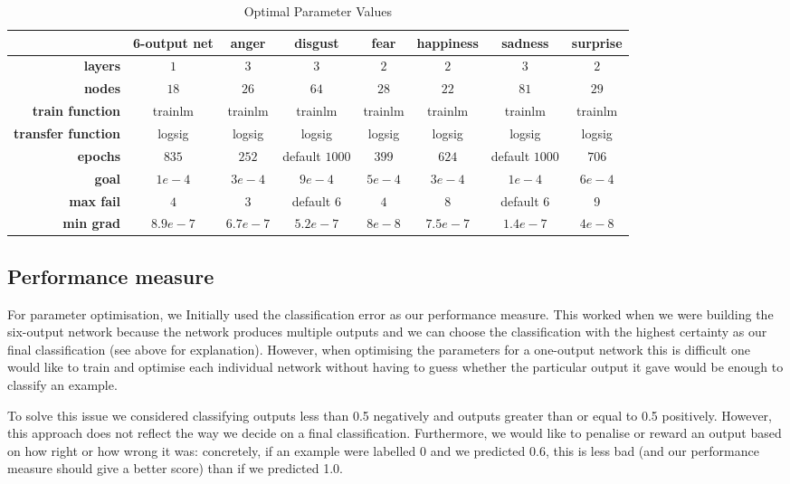 \documentclass[10pt,a4paper]{article}
\begin{document}
\begin{table}
\centering
\begin{tabular}{|r|c||c|c|c|c|c|c|}
\hline 
 & \textbf{6-output net} & \textbf{anger} & \textbf{disgust} & \textbf{fear} & \textbf{happiness} & \textbf{sadness} & \textbf{surprise} \\ 
\hline 
\textbf{layers} & $1$ & $3$ & $3$ & $2$ & $2$ & $3$ & $2$ \\ 
\hline 
\textbf{nodes} & $18$ & $26$ & $64$ & $28$ & $22$ & $81$ & $29$ \\ 
\hline 
\textbf{train function} & trainlm & trainlm & trainlm & trainlm & trainlm & trainlm & trainlm\\
\hline 
\textbf{transfer function} & logsig & logsig & logsig  & logsig & logsig & logsig & logsig \\
\hline 
\textbf{epochs} & $835$ & $252$ & default $1000$ & $399$ & $624$ & default $1000$ & $706$ \\ 
\hline 
\textbf{goal} & $1e-4$ & $3e-4$ & $9e-4$ & $5e-4$ & $3e-4$ & $1e-4$ & $6e-4$ \\ 
\hline 
\textbf{max fail} & $4$ & $3$ & default $6$ & $4$ & $8$ & default $6$ & 9 \\ 
\hline 
\textbf{min grad} & $8.9e-7$ & $6.7e-7$ & $5.2e-7$ & $8e-8$ & $7.5e-7$ & $1.4e-7$ & $4e-8$ \\ 
\hline 
\end{tabular} 
\caption{Optimal Parameter Values}
\label{tab:optimalValues}
\end{table}

\subsection{Performance measure}
For parameter optimisation, we Initially used the classification error as our performance measure. This worked when we were building the six-output network because the network produces multiple outputs and we can choose the classification with the highest certainty as our final classification (see above for explanation). However, when optimising the parameters for a one-output network this is difficult one would like to train and optimise each individual network without having to guess whether the particular output it gave would be enough to classify an example. 

To solve this issue we considered classifying outputs less than 0.5 negatively and outputs greater than or equal to 0.5 positively. However, this approach does not reflect the way we decide on a final classification. Furthermore, we would like to penalise or reward an output based on how right or how wrong it was: concretely, if an example were labelled 0 and we predicted 0.6, this is less bad (and our performance measure should give a better score) than if we predicted 1.0. 
\end{document}
